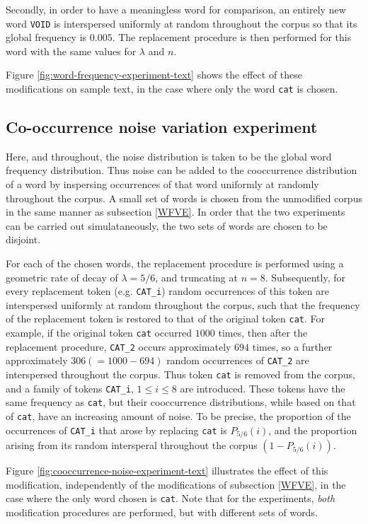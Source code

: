 \documentclass{article} %
\newcommand{\word}[1]{\texttt{#1}}
\begin{document}
Secondly, in order to have a meaningless word for comparison, an entirely new word \word{VOID} is interspersed uniformly at random throughout the corpus so that its global frequency is $0.005$.
The replacement procedure is then performed for this word with the same values for $\lambda$ and $n$.

Figure \ref{fig:word-frequency-experiment-text} shows the effect of these modifications on sample text, in the case where only the word \word{cat} is chosen.

\subsection{Co-occurrence noise variation experiment}\label{CNVE}
Here, and throughout, the noise distribution is taken to be the global word frequency distribution.
Thus noise can be added to the cooccurrence distribution of a word by inspersing occurrences of that word uniformly at randomly throughout the corpus.
A small set of words is chosen from the unmodified corpus in the same manner as subsection \ref{WFVE}.
In order that the two experiments can be carried out simulataneously, the two sets of words are chosen to be disjoint.

For each of the chosen words, the replacement procedure is performed using a geometric rate of decay of $\lambda = 5/6$, and truncating at $n=8$.
Subsequently, for every replacement token (e.g. \word{CAT\_i}) random occurrences of this token are interspersed uniformly at random throughout the corpus, such that the frequency of the replacement token is restored to that of the original token \word{cat}.
For example, if the original token \word{cat} occurred $1000$ times, then after the replacement procedure, \word{CAT\_2} occurs approximately $694$ times, so a further approximately $306 (=1000 - 694)$ random occurrences of \word{CAT\_2} are interspersed throughout the corpus.
Thus token \word{cat} is removed from the corpus, and a family of tokens \word{CAT\_i}, $1 \leqslant i \leqslant 8$ are introduced.
These tokens have the same frequency as \word{cat}, but their cooccurrence distributions, while based on that of \word{cat}, have an increasing amount of noise.
To be precise, the proportion of the occurrences of \word{CAT\_i} that arose by replacing \word{cat} is $P_{5/6}(i)$, and the proportion arising from its random intersperal throughout the corpus $(1 - P_{5/6}(i))$.

Figure \ref{fig:cooccurrence-noise-experiment-text} illustrates the effect of this modification, independently of the modifications of subsection \ref{WFVE}, in the case where the only word chosen is \word{cat}.
Note that for the experiments, \emph{both} modification procedures are performed, but with different sets of words.
\end{document}
